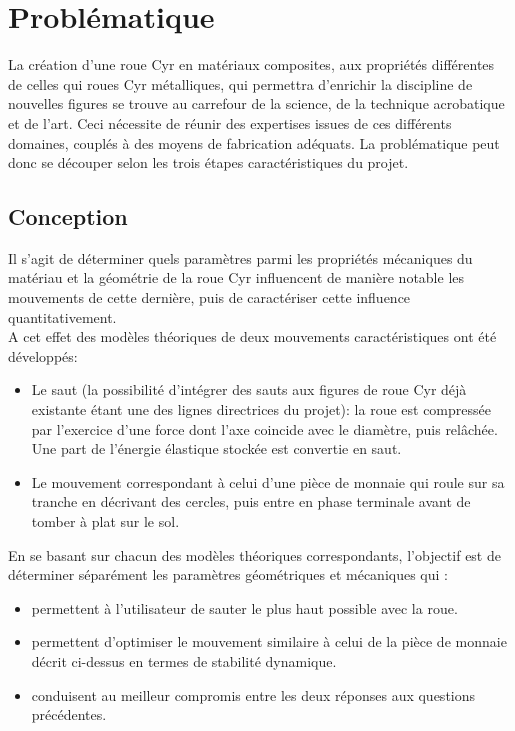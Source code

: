 \clearpage

\section{Problématique}  %
La création d'une roue Cyr en matériaux composites, aux propriétés différentes de celles qui roues Cyr métalliques, qui permettra d'enrichir la discipline de nouvelles figures se trouve au carrefour de la science, de la technique acrobatique et de l'art. Ceci nécessite de réunir des expertises issues de ces différents domaines, couplés à des moyens de fabrication adéquats. La problématique peut donc se découper selon les trois étapes caractéristiques du projet.

\subsection{Conception}
Il s'agit de déterminer quels paramètres parmi les propriétés mécaniques du matériau et la géométrie de la roue Cyr influencent de manière notable les mouvements de cette dernière, puis de caractériser cette influence quantitativement. \\ 
A cet effet des modèles théoriques de deux mouvements caractéristiques ont été développés:
\begin{itemize}
    \item Le saut (la possibilité d’intégrer des sauts aux figures de roue Cyr déjà existante étant une des lignes directrices du projet): la roue est compressée par l'exercice d'une force dont l’axe coincide avec le diamètre, puis relâchée. Une part de l’énergie élastique stockée est convertie en saut. 
    \item Le mouvement correspondant à celui d’une pièce de monnaie qui roule sur sa tranche en décrivant des cercles, puis entre en phase terminale avant de tomber à plat sur le sol.
\end{itemize}

En se basant sur chacun des modèles théoriques correspondants, l’objectif est de déterminer séparément les paramètres géométriques et mécaniques qui :
\begin{itemize}
    \item  permettent à l’utilisateur de sauter le plus haut possible avec la roue.
    \item permettent d’optimiser le mouvement similaire à celui de la pièce de monnaie décrit ci-dessus en termes de stabilité dynamique.
    \item conduisent au meilleur compromis entre les deux réponses aux questions précédentes.
\end{itemize}


